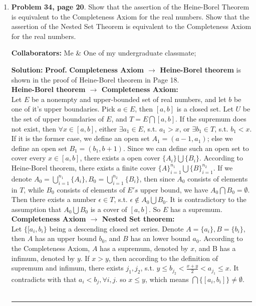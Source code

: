 \documentclass{article}%
\newenvironment{proof}[1][Proof]{\textbf{#1.} }{\ \rule{0.5em}{0.5em}}
\begin{document}
\begin{enumerate}
\item \textbf{Problem 34, page 20}.  Show that the assertion of the Heine-Borel Theorem is equivalent to the Completeness Axiom for the real numbers.  Show that the assertion of the Nested Set Theorem is equivalent to the Completeness Axiom for the real numbers.

\bigskip
\textbf{Collaborators:} Me \& One of my undergraduate classmate;
\smallskip
 
\textbf{Solution:}
\begin{proof}
\textbf{Completeness Axiom $\to$ Heine-Borel theorem} is shown in the proof of Heine-Borel theorem in Page 18.
\\[5pt]
\textbf{Heine-Borel theorem $\to$ Completeness Axiom:} \\
Let $E$ be a nonempty and upper-bounded set of real numbers, and let $b$ be one of it's upper boundaries. Pick $a\in E$, then $[a, b]$ is a closed set. Let $U$ be the set of upper boundaries of $E$, and $T = E\bigcap [a, b]$. If the supremum does not exist, then $\forall x\in[a, b]$, either $\exists a_1\in E$, s.t. $a_1 > x$, or $\exists b_1\in T$, s.t. $b_1 < x$. If it is the former case, we define an open set $A_1 = (a-1, a_1)$; else we define an open set $B_1 = (b_1, b+1)$. Since we can define such an open set to cover every $x\in [a, b]$, there exists a open cover $\{A_i\}\bigcup\{B_i\}$. According to Heine-Borel theorem, there exists a finite cover $\{A\}_{i = 1}^{n_1}\bigcup\{B\}_{i = 1}^{n_2}$. If we denote $A_0 = \bigcup_{i=1}^{n_1}\{A_i\}, B_0 = \bigcup_{i=1}^{n_2}\{B_i\}$, then since $A_0$ consists of elements in $T$, while $B_0$ consists of elements of $E's$ upper bound, we have $A_0\bigcap B_0 = \emptyset$. Then there exists a number $\epsilon\in T$, s.t. $\epsilon\notin A_0\bigcup B_0$. It is contradictory to the assumption that $A_0\bigcup B_0$ is a cover of $[a, b]$. So $E$ has a supremum. \\[5pt]
\textbf{Completeness Axiom $\to$ Nested Set theorem:} \\
Let $\{[a_i, b_i\}$ being a descending closed set series. Denote $A = \{a_i\}, B = \{b_i\}$, then $A$ has an upper bound $b_0$, and $B$ has an lower bound $a_0$. According to the Completeness Axiom, $A$ has a supremum, denoted by $x$, and B has a infimum, denoted by $y$. If $x > y$, then according to the definition of supremum and infimum, there exists $j_1, j_2$, s.t. $y \le b_{j_2} < \frac{x+y}{2} < a_{j_1} \le x$. It contradicts with that $a_i < b_j, \forall i, j$. so $x \le y$, which means $\bigcap \{[a_i, b_i]\} \ne \emptyset$. \\

\end{proof}
\end{enumerate}
\end{document}
